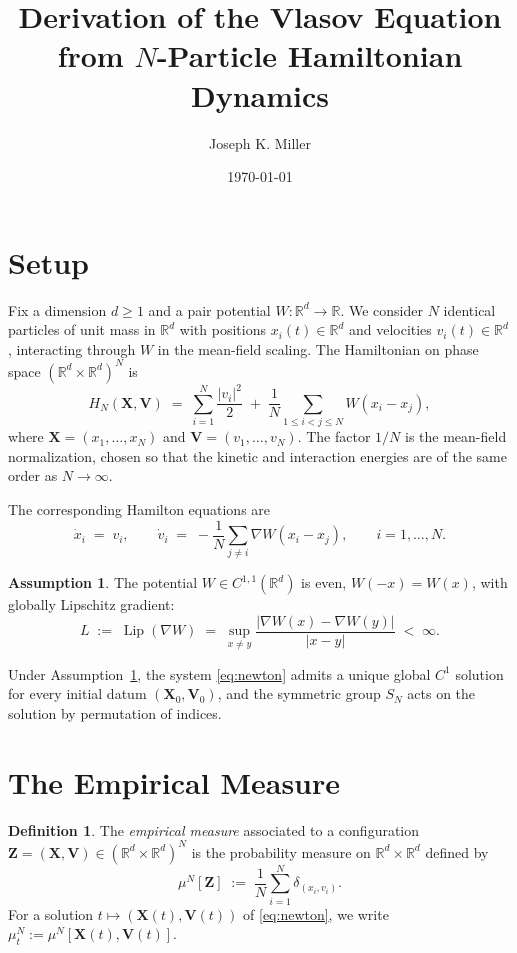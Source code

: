 \documentclass[11pt]{article}
\title{Derivation of the Vlasov Equation \\ from $N$-Particle Hamiltonian Dynamics}
\author{Joseph K. Miller}
\date{\today}
\theoremstyle{definition}
\newtheorem{definition}[theorem]{Definition}
\newtheorem{assumption}[theorem]{Assumption}
\theoremstyle{remark}
\newcommand{\R}{\mathbb{R}}
\newcommand{\X}{\mathbf{X}}
\newcommand{\V}{\mathbf{V}}
\newcommand{\Z}{\mathbf{Z}}
\DeclareMathOperator{\Lip}{Lip}
\begin{document}
\maketitle

\section{Setup}

Fix a dimension $d \ge 1$ and a pair potential $W : \R^d \to \R$. We consider $N$ identical
particles of unit mass in $\R^d$ with positions $x_i(t) \in \R^d$ and velocities $v_i(t) \in \R^d$,
interacting through $W$ in the mean-field scaling. The Hamiltonian on phase space
$(\R^d \times \R^d)^N$ is
\begin{equation}
  H_N(\X, \V) \;=\; \sum_{i=1}^{N} \frac{|v_i|^2}{2}
  \;+\; \frac{1}{N} \sum_{1 \le i < j \le N} W(x_i - x_j),
  \label{eq:HN}
\end{equation}
where $\X = (x_1, \ldots, x_N)$ and $\V = (v_1, \ldots, v_N)$. The factor $1/N$ is the
mean-field normalization, chosen so that the kinetic and interaction energies are of the
same order as $N \to \infty$.

The corresponding Hamilton equations are
\begin{equation}
  \dot{x}_i \;=\; v_i, \qquad
  \dot{v}_i \;=\; -\frac{1}{N} \sum_{j \neq i} \nabla W(x_i - x_j),
  \qquad i = 1, \ldots, N.
  \label{eq:newton}
\end{equation}

\begin{assumption}\label{ass:W}
The potential $W \in C^{1,1}(\R^d)$ is even, $W(-x) = W(x)$, with globally Lipschitz gradient:
\[
  L \;:=\; \Lip(\nabla W) \;=\; \sup_{x \neq y} \frac{|\nabla W(x) - \nabla W(y)|}{|x-y|} \;<\; \infty.
\]
\end{assumption}

Under Assumption~\ref{ass:W}, the system \eqref{eq:newton} admits a unique global $C^1$ solution
for every initial datum $(\X_0, \V_0)$, and the symmetric group $S_N$ acts on the solution by
permutation of indices.

\section{The Empirical Measure}

\begin{definition}
The \emph{empirical measure} associated to a configuration $\Z = (\X, \V) \in (\R^d \times \R^d)^N$
is the probability measure on $\R^d \times \R^d$ defined by
\[
  \mu^N[\Z] \;:=\; \frac{1}{N} \sum_{i=1}^{N} \delta_{(x_i, v_i)}.
\]
For a solution $t \mapsto (\X(t), \V(t))$ of \eqref{eq:newton}, we write $\mu_t^N := \mu^N[\X(t), \V(t)]$.
\end{definition}
\end{document}
